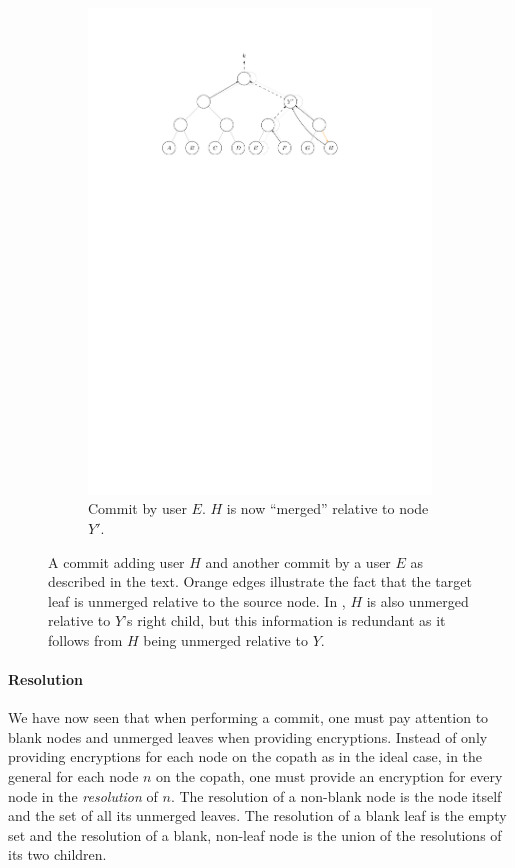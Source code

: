 \begin{figure}
\begin{subfigure}[b]{\textwidth}
		\includegraphics[width=\textwidth]{./figures/treekem-add-2}
		\caption{Commit by user $E$. $H$ is now ``merged'' relative to node $Y'$.}
	\end{subfigure}
	\caption{A commit adding user $H$ and another commit by a user $E$ as described in the text. Orange edges illustrate the fact that the target leaf is unmerged relative to the source node. In , $H$ is also unmerged relative to $Y$'s right child, but this information is redundant as it follows from $H$ being unmerged relative to $Y$.}
	\label{fig:treekem-add}
\end{figure}

\paragraph{Resolution} We have now seen that when performing a commit, one must pay attention to blank nodes and unmerged leaves when providing encryptions. Instead of only providing encryptions for each node on the copath as in the ideal case, in the general for each node $n$ on the copath, one must provide an encryption for every node in the \emph{resolution} of $n$. The resolution of a non-blank node is the node itself and the set of all its unmerged leaves. The resolution of a blank leaf is the empty set and the resolution of a blank, non-leaf node is the union of the resolutions of its two children.

